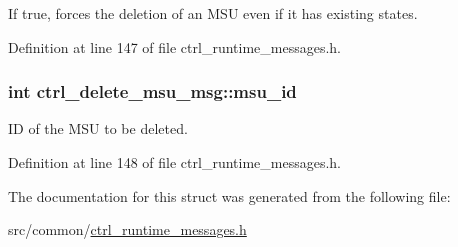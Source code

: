 If {\ttfamily true}, forces the deletion of an M\-S\-U even if it has existing states. 



Definition at line 147 of file ctrl\-\_\-runtime\-\_\-messages.\-h.

\hypertarget{structctrl__delete__msu__msg_a1ae44491d0840269eeec01757753fcb6}{
\subsubsection[{msu\-\_\-id}]{\setlength{\rightskip}{0pt plus 5cm}int ctrl\-\_\-delete\-\_\-msu\-\_\-msg\-::msu\-\_\-id}}\label{structctrl__delete__msu__msg_a1ae44491d0840269eeec01757753fcb6}


I\-D of the M\-S\-U to be deleted. 



Definition at line 148 of file ctrl\-\_\-runtime\-\_\-messages.\-h.



The documentation for this struct was generated from the following file\-:\begin{DoxyCompactItemize}
\item 
src/common/\hyperlink{ctrl__runtime__messages_8h}{ctrl\-\_\-runtime\-\_\-messages.\-h}\end{DoxyCompactItemize}

